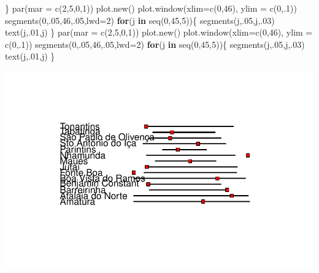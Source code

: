 \documentclass[
  letterpaper,
  DIV=11,
  numbers=noendperiod]{scrreprt}
\newenvironment{Shaded}{\begin{snugshade}}{\end{snugshade}}
\newcommand{\AttributeTok}[1]{\textcolor[rgb]{0.40,0.45,0.13}{#1}}
\newcommand{\ControlFlowTok}[1]{\textcolor[rgb]{0.00,0.23,0.31}{\textbf{#1}}}
\newcommand{\DecValTok}[1]{\textcolor[rgb]{0.68,0.00,0.00}{#1}}
\newcommand{\FunctionTok}[1]{\textcolor[rgb]{0.28,0.35,0.67}{#1}}
\newcommand{\NormalTok}[1]{\textcolor[rgb]{0.00,0.23,0.31}{#1}}
\theoremstyle{definition}
\theoremstyle{definition}
\theoremstyle{plain}
\theoremstyle{remark}
\begin{document}
\begin{Shaded}
\begin{Highlighting}[]
\NormalTok{\}}
  \FunctionTok{par}\NormalTok{(}\AttributeTok{mar =} \FunctionTok{c}\NormalTok{(}\DecValTok{2}\NormalTok{,}\DecValTok{5}\NormalTok{,}\DecValTok{0}\NormalTok{,}\DecValTok{1}\NormalTok{))}
  \FunctionTok{plot.new}\NormalTok{()}
  \FunctionTok{plot.window}\NormalTok{(}\AttributeTok{xlim=}\FunctionTok{c}\NormalTok{(}\DecValTok{0}\NormalTok{,}\DecValTok{46}\NormalTok{), }\AttributeTok{ylim =} \FunctionTok{c}\NormalTok{(}\DecValTok{0}\NormalTok{,.}\DecValTok{1}\NormalTok{))}
  \FunctionTok{segments}\NormalTok{(}\DecValTok{0}\NormalTok{,.}\DecValTok{05}\NormalTok{,}\DecValTok{46}\NormalTok{,.}\DecValTok{05}\NormalTok{,}\AttributeTok{lwd=}\DecValTok{2}\NormalTok{)}
 \ControlFlowTok{for}\NormalTok{(j }\ControlFlowTok{in} \FunctionTok{seq}\NormalTok{(}\DecValTok{0}\NormalTok{,}\DecValTok{45}\NormalTok{,}\DecValTok{5}\NormalTok{))\{}
    \FunctionTok{segments}\NormalTok{(j,.}\DecValTok{05}\NormalTok{,j,.}\DecValTok{03}\NormalTok{)}
    \FunctionTok{text}\NormalTok{(j,.}\DecValTok{01}\NormalTok{,j)}
\NormalTok{  \}}
    \FunctionTok{par}\NormalTok{(}\AttributeTok{mar =} \FunctionTok{c}\NormalTok{(}\DecValTok{2}\NormalTok{,}\DecValTok{5}\NormalTok{,}\DecValTok{0}\NormalTok{,}\DecValTok{1}\NormalTok{))}
  \FunctionTok{plot.new}\NormalTok{()}
  \FunctionTok{plot.window}\NormalTok{(}\AttributeTok{xlim=}\FunctionTok{c}\NormalTok{(}\DecValTok{0}\NormalTok{,}\DecValTok{46}\NormalTok{), }\AttributeTok{ylim =} \FunctionTok{c}\NormalTok{(}\DecValTok{0}\NormalTok{,.}\DecValTok{1}\NormalTok{))}
  \FunctionTok{segments}\NormalTok{(}\DecValTok{0}\NormalTok{,.}\DecValTok{05}\NormalTok{,}\DecValTok{46}\NormalTok{,.}\DecValTok{05}\NormalTok{,}\AttributeTok{lwd=}\DecValTok{2}\NormalTok{)}
  \ControlFlowTok{for}\NormalTok{(j }\ControlFlowTok{in} \FunctionTok{seq}\NormalTok{(}\DecValTok{0}\NormalTok{,}\DecValTok{45}\NormalTok{,}\DecValTok{5}\NormalTok{))\{}
    \FunctionTok{segments}\NormalTok{(j,.}\DecValTok{05}\NormalTok{,j,.}\DecValTok{03}\NormalTok{)}
    \FunctionTok{text}\NormalTok{(j,.}\DecValTok{01}\NormalTok{,j)}
\NormalTok{  \}}
\end{Highlighting}
\end{Shaded}

\includegraphics{poisson_files/figure-pdf/unnamed-chunk-7-1.pdf}
\end{document}

